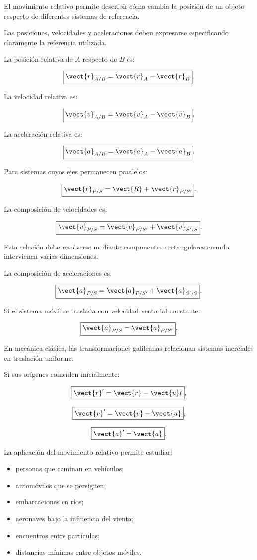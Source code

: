 \begin{resumen}

El movimiento relativo permite describir
cómo cambia la posición de un objeto
respecto de diferentes sistemas de referencia.

Las posiciones, velocidades y aceleraciones
deben expresarse especificando claramente
la referencia utilizada.

La posición relativa de \(A\)
respecto de \(B\) es:

\[
\boxed{
\vect{r}_{A/B}
=
\vect{r}_A-\vect{r}_B
}.
\]

La velocidad relativa es:

\[
\boxed{
\vect{v}_{A/B}
=
\vect{v}_A-\vect{v}_B
}.
\]

La aceleración relativa es:

\[
\boxed{
\vect{a}_{A/B}
=
\vect{a}_A-\vect{a}_B
}.
\]

Para sistemas cuyos ejes permanecen paralelos:

\[
\boxed{
\vect{r}_{P/S}
=
\vect{R}
+
\vect{r}_{P/S'}
}.
\]

La composición de velocidades es:

\[
\boxed{
\vect{v}_{P/S}
=
\vect{v}_{P/S'}
+
\vect{v}_{S'/S}
}.
\]

Esta relación debe resolverse
mediante componentes rectangulares
cuando intervienen varias dimensiones.

La composición de aceleraciones es:

\[
\boxed{
\vect{a}_{P/S}
=
\vect{a}_{P/S'}
+
\vect{a}_{S'/S}
}.
\]

Si el sistema móvil se traslada
con velocidad vectorial constante:

\[
\boxed{
\vect{a}_{P/S}
=
\vect{a}_{P/S'}
}.
\]

En mecánica clásica, las transformaciones
galileanas relacionan sistemas inerciales
en traslación uniforme.

Si sus orígenes coinciden inicialmente:

\[
\boxed{
\vect{r}'=\vect{r}-\vect{u}t
},
\]

\[
\boxed{
\vect{v}'=\vect{v}-\vect{u}
},
\]

\[
\boxed{
\vect{a}'=\vect{a}
}.
\]

La aplicación del movimiento relativo
permite estudiar:

\begin{itemize}
    \item personas que caminan en vehículos;
    \item automóviles que se persiguen;
    \item embarcaciones en ríos;
    \item aeronaves bajo la influencia del viento;
    \item encuentros entre partículas;
    \item distancias mínimas entre objetos móviles.
\end{itemize}


\end{resumen}
